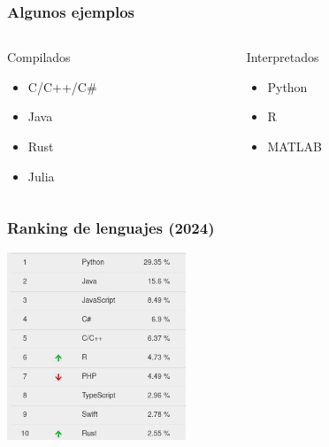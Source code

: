 \documentclass[14pt,aspectratio=169,xcolor=dvipsnames]{beamer}
\begin{document}
\begin{frame}\frametitle{Algunos ejemplos}
    \begin{columns}
        \begin{column}{0.45\textwidth}
            Compilados
            \begin{itemize}
                \item C/C++/C\#
                \item Java
                \item Rust
                \item Julia
            \end{itemize}
        \end{column}

        \begin{column}{0.45\textwidth}
            Interpretados
            \begin{itemize}
                \item Python
                \item R
                \item MATLAB
            \end{itemize}
        \end{column}
    \end{columns}
\end{frame}
\begin{frame}\frametitle{Ranking de lenguajes (2024)}
    \begin{center}
        \includegraphics[width=0.4\textwidth]{../images/top-lenguajes.png}
    \end{center}
\end{frame}
\end{document}
